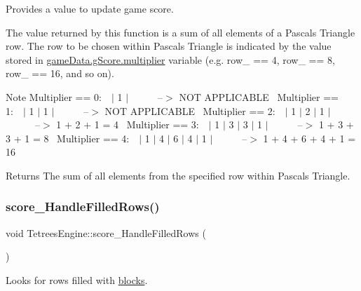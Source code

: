 Provides a value to update game score. 

The value returned by this function is a sum of all elements of a Pascal\textquotesingle{}s Triangle row. The row to be chosen within Pascal\textquotesingle{}s Triangle is indicated by the value stored in \hyperlink{structgame__score__t}{game\+Data.g\+Score.multiplier} variable (e.\+g. row\+\_ == 4, row\+\_ == 8, row\+\_ == 16, and so on). \begin{DoxyNote}{Note}
Multiplier == 0\+:~~$\vert$ 1 $\vert$~~~~~~--$>$ N\+OT A\+P\+P\+L\+I\+C\+A\+B\+LE~\newline
 Multiplier == 1\+:~~$\vert$ 1 $\vert$ 1 $\vert$~~~~~~--$>$ N\+OT A\+P\+P\+L\+I\+C\+A\+B\+LE~\newline
 Multiplier == 2\+:~~$\vert$ 1 $\vert$ 2 $\vert$ 1 $\vert$~~~~~~--$>$ 1 + 2 + 1 = 4~\newline
 Multiplier == 3\+:~~$\vert$ 1 $\vert$ 3 $\vert$ 3 $\vert$ 1 $\vert$~~~~~~--$>$ 1 + 3 + 3 + 1 = 8~\newline
 Multiplier == 4\+:~~$\vert$ 1 $\vert$ 4 $\vert$ 6 $\vert$ 4 $\vert$ 1 $\vert$~~~~~~--$>$ 1 + 4 + 6 + 4 + 1 = 16~\newline

\end{DoxyNote}
\begin{DoxyReturn}{Returns}
The sum of all elements from the specified row within Pascal\textquotesingle{}s Triangle. 
\end{DoxyReturn}
\mbox{\label{classTetreesEngine_ad379bf5d98a182411d4d91b12b6ef5ba}} 
\subsubsection{\texorpdfstring{score\+\_\+\+Handle\+Filled\+Rows()}{score\_HandleFilledRows()}}
{\footnotesize\ttfamily void Tetrees\+Engine\+::score\+\_\+\+Handle\+Filled\+Rows (\begin{DoxyParamCaption}{ }\end{DoxyParamCaption})\hspace{0.3cm}{\ttfamily [private]}}



Looks for rows filled with \hyperlink{TetreesDefs_8hpp_ad8f0654cf997b7ea7eb14924d0b1ea33}{blocks}. 

